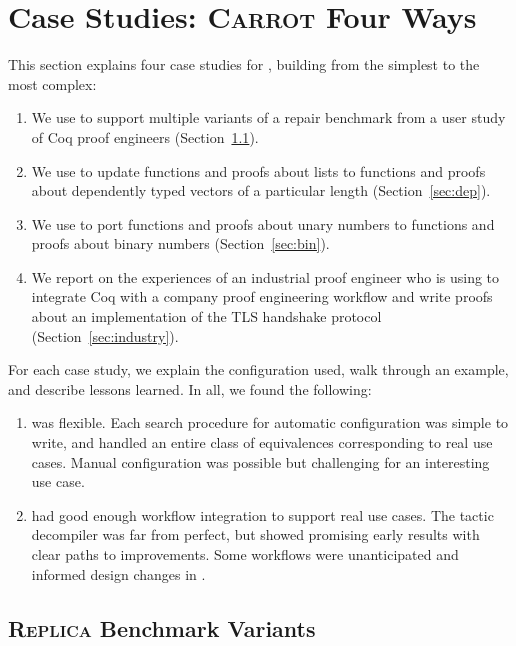 \section{Case Studies: \textsc{Carrot} Four Ways}
\label{sec:search}

This section explains four case studies for \toolname, building from the simplest to the most complex:

\begin{enumerate}
\item We use \toolname to support multiple variants of a repair benchmark from a user study of Coq proof engineers (Section~\ref{sec:replica}).
\item We use \toolname to update functions and proofs about lists to functions and proofs about dependently typed vectors of
a particular length (Section~\ref{sec:dep}).
\item We use \toolname to port functions and proofs about unary numbers to functions and proofs about binary numbers (Section~\ref{sec:bin}).
\item We report on the experiences of an industrial proof engineer who is using \toolname to integrate Coq with a company proof engineering workflow and write proofs about an implementation of the TLS handshake protocol (Section~\ref{sec:industry}).
\end{enumerate}
For each case study, we explain the configuration used, walk through an example, and describe lessons learned.
In all, we found the following:

\begin{enumerate}
\item \toolname was flexible. Each search procedure for automatic configuration
was simple to write, and handled an entire class of equivalences corresponding to real use cases.
Manual configuration was possible but challenging for an interesting use case.
\item \toolname had good enough workflow integration to support real use cases.
The tactic decompiler was far from perfect, but showed promising early results with clear paths to improvements.
Some workflows were unanticipated and informed design changes in \toolname.
\end{enumerate}

\subsection{\textsc{Replica} Benchmark Variants}
\label{sec:replica}

